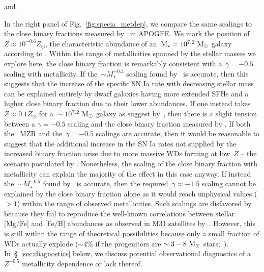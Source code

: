 \documentclass[ms.tex]{subfiles}
\begin{document}
\citet{Gallazzi2005} and~\citet{Kirby2013}.
\par
In the right panel of Fig.~\ref{fig:specia_metdep}, we compare the same
scalings to the close binary fractions measured by~\citet{Moe2019} in APOGEE.
We mark the position of~$Z \approx 10^{-0.6} Z_\odot$, the characteristic
abundance of an~$\text{M}_\star = 10^{7.2}~\text{M}_\odot$ galaxy according to
\citet{Zahid2014}.
Within the range of metallicities spanned by the stellar masses we explore here,
the close binary fraction is remarkably consistent with a~$\gamma = -0.5$
scaling with metallicity.
If the~$\sim M_\star^{-0.3}$ scaling found by~\citet{Gandhi2022} is accurate,
then this suggests that the increase of the specific SN Ia rate with decreasing
stellar mass can be explained entirely by dwarf galaxies having more extended
SFHs and a higher close binary fraction due to their lower abundances.
If one instead takes~$Z \approx 0.1Z_\odot$ for a~$\sim10^{7.2}~\text{M}_\odot$ galaxy
as suggest by~\citet{Andrews2013}, then there is a slight tension between a
$\gamma = -0.5$ scaling and the close binary fraction measured by
\citet{Moe2019}.
If both the~\citet{Andrews2013} MZR and the~$\gamma = -0.5$ scalings are
accurate, then it would be reasonable to suggest that the additional increase
in the SN Ia rates not supplied by the increased binary fraction arise due to
more massive WDs forming at low~$Z$ -- the scenario postulated by
\citet{Kistler2013}.
Nonetheless, the scaling of the close binary fraction with metallicity can
explain the majority of the effect in this case anyway.
If instead the~$\sim M_\star^{-0.5}$ found by~\citet{Brown2019} is accurate,
then the required~$\gamma \approx -1.5$ scaling cannot be explained by the
close binary fraction alone as it would reach unphysical values ($>1$) within
the range of observed metallicities.
Such scalings are disfavored by~\citet{Gandhi2022} because they fail to
reproduce the well-known correlations between stellar [Mg/Fe] and [Fe/H]
abundances as observed in M31 satellites by~\citep*{Vargas2014}.
However, this is still within the range of theoretical possibilities because
only a small fraction of WDs actually explode ($\sim4$\% if the progenitors are
$\sim3 - 8~\text{M}_\odot$ stars;~\citealp{Maoz2012b}).
In~\S~\ref{sec:diagnostics} below, we discuss potential observational
diagnostics of a~$Z^{-0.5}$ metallicity dependence or lack thereof.
\end{document}
